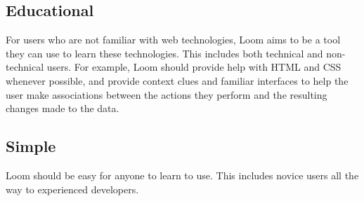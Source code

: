 \documentclass[conference, letterpaper]{IEEEtran}
\begin{document}
\subsection{Educational}
For users who are not familiar with web technologies, Loom aims to be a tool they can use to learn these technologies. This includes both technical and non-technical users. For example, Loom should provide help with HTML and CSS whenever possible, and provide context clues and familiar interfaces to help the user make associations between the actions they perform and the resulting changes made to the data.

\subsection{Simple}
Loom should be easy for anyone to learn to use. This includes novice users all the way to experienced developers.

%
%





\end{document}
